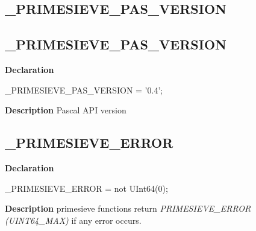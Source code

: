 \documentclass{report}
\newif\ifpdf
\begin{document}
\subsection*{\large{\textbf{{\_}PRIMESIEVE{\_}PAS{\_}VERSION}}\normalsize\hspace{1ex}\hrulefill}
\else
\subsection*{{\_}PRIMESIEVE{\_}PAS{\_}VERSION}
\fi
\label{primesieve-_PRIMESIEVE_PAS_VERSION}
\begin{list}{}{
\setlength{\itemindent}{0cm}
\setlength{\listparindent}{0cm}
\setlength{\leftmargin}{\evensidemargin}
\addtolength{\leftmargin}{\tmplength}
\settowidth{\labelsep}{X}
\addtolength{\leftmargin}{\labelsep}
\setlength{\labelwidth}{\tmplength}
}
\item[\textbf{Declaration}\hfill]
\ifpdf
\begin{flushleft}
\fi
\begin{ttfamily}
{\_}PRIMESIEVE{\_}PAS{\_}VERSION = '0.4';\end{ttfamily}

\ifpdf
\end{flushleft}
\fi

\par
\item[\textbf{Description}]
Pascal API version

\end{list}
\ifpdf
\subsection*{\large{\textbf{{\_}PRIMESIEVE{\_}ERROR}}\normalsize\hspace{1ex}\hrulefill}
\else
\subsection*{{\_}PRIMESIEVE{\_}ERROR}
\fi
\label{primesieve-_PRIMESIEVE_ERROR}
\begin{list}{}{
\setlength{\itemindent}{0cm}
\setlength{\listparindent}{0cm}
\setlength{\leftmargin}{\evensidemargin}
\addtolength{\leftmargin}{\tmplength}
\settowidth{\labelsep}{X}
\addtolength{\leftmargin}{\labelsep}
\setlength{\labelwidth}{\tmplength}
}
\item[\textbf{Declaration}\hfill]
\ifpdf
\begin{flushleft}
\fi
\begin{ttfamily}
{\_}PRIMESIEVE{\_}ERROR = not UInt64(0);\end{ttfamily}

\ifpdf
\end{flushleft}
\fi

\par
\item[\textbf{Description}]
primesieve functions return \textit{PRIMESIEVE{\_}ERROR (UINT64{\_}MAX)} if any error occurs.

\end{list}
\ifpdf
\end{document}
